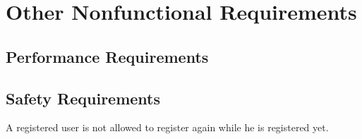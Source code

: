 \documentclass{scrreprt}
\begin{document}
\begin{comment}
\section{Goal3}
\subsection{Description and Priority}

\subsection{Stimulus/Response Sequences}
(see diagram \vref{fig:usecases})
\subsection{Functional Requirements}
\begin{enumerate}[label=R\arabic*.,resume]
\item
\end{enumerate}
\end{comment}

\chapter{Other Nonfunctional Requirements}

\section{Performance Requirements}
\begin{comment}$<$If there are performance requirements for the product under various 
circumstances, state them here and explain their rationale, to help the 
developers understand the intent and make suitable design choices. Specify the 
timing relationships for real time systems. Make such requirements as specific 
as possible. You may need to state performance requirements for individual 
functional requirements or features.$>$
\end{comment}

\section{Safety Requirements}
A registered user is not allowed to register again while he is registered yet.

\begin{comment}$<$Specify those requirements that are concerned with possible loss, damage, or 
harm that could result from the use of the product. Define any safeguards or 
actions that must be taken, as well as actions that must be prevented. Refer to 
any external policies or regulations that state safety issues that affect the 
product's design or use. Define any safety certifications that must be 
satisfied.$>$
\end{comment}
\end{document}
